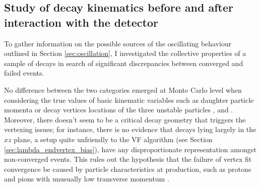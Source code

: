 %
%
%



\subsection{Study of decay kinematics before and after interaction with the detector}
\label{sec:3:kinematics_at_first_meas}
To gather information on the possible sources of the oscillating behaviour outlined in Section \ref{sec:oscillation}, I investigated the collective properties of a sample of \demonstratorshort decays in search of significant discrepancies between converged and failed events.

No difference between the two categories emerged at Monte Carlo level when considering the true values of basic kinematic variables such as daughter particle momenta or decay vertices locations of the three unstable particles \lbz, \lz and \jpsi.
Moreover, there doesn't seem to be a critical decay geometry that triggers the vertexing issues;
for instance, there is no evidence that \lambdadecay decays lying largely in the $xz$ plane, a setup quite unfriendly to the VF algorithm (see Section \ref{sec:lambda_endvertex_bias}), have any disproportionate representation amongst non-converged events.
This rules out the hypothesis that the failure of vertex fit convergence be caused by particle characteristics at production, such as protons and pions with unusually low transverse momentum \pt.

